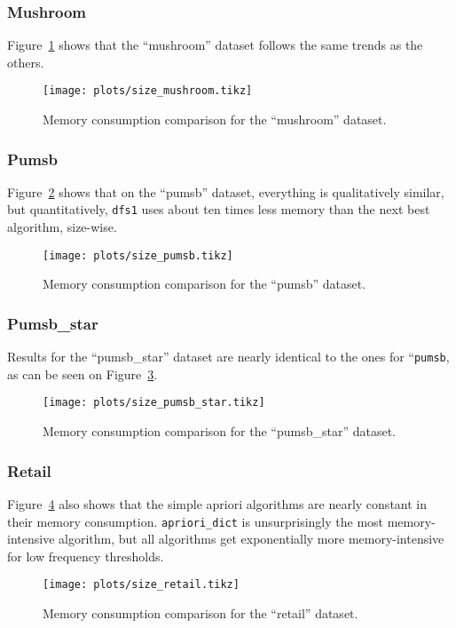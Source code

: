 \documentclass[journal, 9pt]{IEEEtran}
\theoremstyle{definition}
\newcommand{\py}[1]{\texttt{#1}}
\begin{document}
\subsubsection{Mushroom}
Figure~\ref{fig:size_mushroom} shows that the ``mushroom'' dataset follows the same trends as the others.
\begin{figure}[!hbtp]
	\centering
	\texttt{[image: plots/size\_mushroom.tikz]}
	\caption{Memory consumption comparison for the ``mushroom'' dataset.}
	\label{fig:size_mushroom}
\end{figure}

\subsubsection{Pumsb}
Figure~\ref{fig:size_pumsb} shows that on the ``pumsb'' dataset, everything is qualitatively similar, but quantitatively, \py{dfs1} uses about ten times less memory than the next best algorithm, size-wise.
\begin{figure}[!hbtp]
	\centering
	\texttt{[image: plots/size\_pumsb.tikz]}
	\caption{Memory consumption comparison for the ``pumsb'' dataset.}
	\label{fig:size_pumsb}
\end{figure}

\subsubsection{Pumsb\_star}
Results for the ``pumsb\_star'' dataset are nearly identical to the ones for ``\py{pumsb}, as can be seen on Figure~\ref{fig:size_pumsb_star}.
\begin{figure}[!hbtp]
	\centering
	\texttt{[image: plots/size\_pumsb\_star.tikz]}
	\caption{Memory consumption comparison for the ``pumsb\_star'' dataset.}
	\label{fig:size_pumsb_star}
\end{figure}

\subsubsection{Retail}
Figure~\ref{fig:size_retail} also shows that the simple apriori algorithms are nearly constant in their memory consumption.
\py{apriori_dict} is unsurprisingly the most memory-intensive algorithm, but all algorithms get exponentially more memory-intensive for low frequency thresholds.
\begin{figure}[!hbtp]
	\centering
	\texttt{[image: plots/size\_retail.tikz]}
	\caption{Memory consumption comparison for the ``retail'' dataset.}
	\label{fig:size_retail}
\end{figure}
\end{document}
